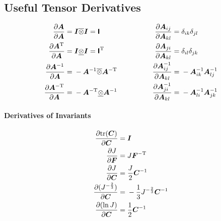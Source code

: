 \documentclass[10pt,letterpaper,oneside]{report}
\newcommand{\ten}[1]{\mbox{\boldmath $#1$}{}}
\newcommand{\tenf}[1]{\mbox{{\sffamily{\bfseries {#1}}}}}
\newcommand{\scas}[1]{\mbox{{\scriptsize{${\rm{#1}}$}}}{}}
\begin{document}
\begin{itemize}
\subsection{Useful Tensor Derivatives}

\begin{align}
\frac{\partial \ten{A}}{\partial \ten{A}} ={}& \ten{I} \overline{\otimes} \ten{I} = \tenf{I}
\qquad & \qquad
\frac{\partial \ten{A}_{ij}}{\partial \ten{A}_{kl}} ={}& \delta_{ik} \delta_{jl}  
\\
\frac{\partial \ten{A}^{\scas{T}}}{\partial \ten{A}} ={}& \ten{I} \underline{\otimes} \ten{I} = \tenf{I}^{\scas{T}} 
\qquad & \qquad
\frac{\partial \ten{A}_{ji}}{\partial \ten{A}_{kl}} ={}& \delta_{il} \delta_{jk}
\\
\frac{\partial \ten{A}^{-1}}{\partial \ten{A}} ={}& - \ten{A}^{-1} \overline{\otimes} \ten{A}^{-\scas{T}} 
\qquad & \qquad
\frac{\partial \ten{A}^{-1}_{ij}}{\partial \ten{A}_{kl}} ={}& - \ten{A}^{-1}_{ik} \ten{A}^{-1}_{lj} 
\\
\frac{\partial \ten{A}^{-\scas{T}}}{\partial \ten{A}} ={}& - \ten{A}^{-\scas{T}} \underline{\otimes} \ten{A}^{-1} 
\qquad & \qquad
\frac{\partial \ten{A}^{-1}_{ji}}{\partial \ten{A}_{kl}} ={}& - \ten{A}^{-1}_{li} \ten{A}^{-1}_{jk} 
\end{align}

\paragraph{Derivatives of Invariants}
\begin{align}
\frac{\partial \mbox{tr} (\ten{C}) }{\partial \ten{C} } ={}& \ten{I} 
\\
\frac{\partial J}{\partial \ten{F}} ={}& J \ten{F}^{-\scas{T}} 
\\
\frac{\partial J}{\partial \ten{C}} ={}& \frac{J}{2} \ten{C}^{-1} 
\\
\frac{\partial (J^{-\frac{2}{3}}) }{\partial \ten{C}} ={}& -\frac{1}{3} J^{-\frac{2}{3}} \ten{C}^{-1} 
\\
\frac{\partial (\ln J) }{\partial \ten{C}} ={}& \frac{1}{2} \ten{C}^{-1}
\end{align}



\end{itemize}
\end{document}

